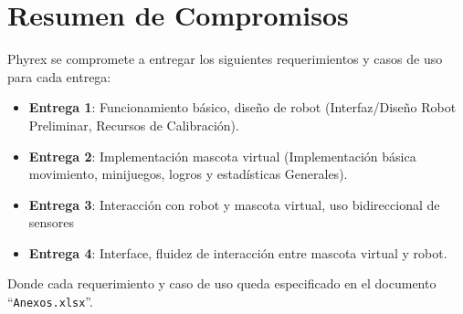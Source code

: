 \section{Resumen de Compromisos}
Phyrex se compromete a entregar los siguientes requerimientos y casos de uso para cada entrega:

\begin{itemize}
\item {\bf Entrega 1}: Funcionamiento b\'asico, dise\~no de robot (Interfaz/Dise\~no Robot Preliminar, Recursos de Calibraci\'on).
\item {\bf Entrega 2}: Implementaci\'on mascota virtual (Implementaci\'on b\'asica movimiento, minijuegos, logros y estad\'isticas Generales).
\item {\bf Entrega 3}: Interacci\'on con robot y mascota virtual, uso bidireccional de sensores
\item {\bf Entrega 4}: Interface, fluidez de interacci\'on entre mascota virtual y robot.
\end{itemize}

Donde cada requerimiento y caso de uso queda especificado en el documento ``\verb+Anexos.xlsx+''.
\newpage
